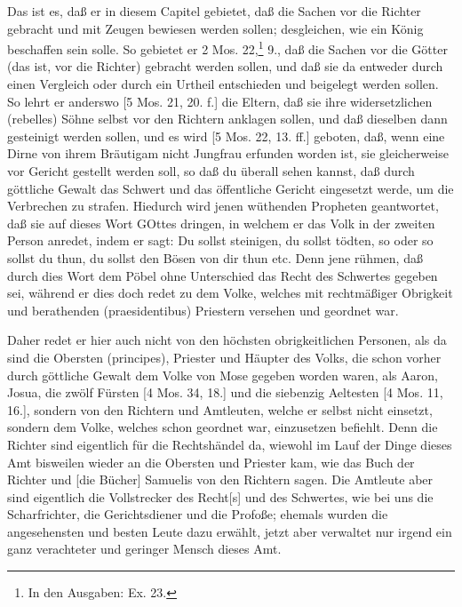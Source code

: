 Das ist es, daß er in diesem Capitel gebietet, daß die Sachen vor die Richter gebracht und mit Zeugen bewiesen werden sollen; desgleichen, wie ein König beschaffen sein solle. So gebietet er 2 Mos. 22,\footnote{In den Ausgaben: Ex. 23.} 9., daß die Sachen vor die Götter (das ist, vor die Richter) gebracht werden sollen, und daß sie da entweder durch einen Vergleich oder durch ein Urtheil entschieden und beigelegt werden sollen. So lehrt er anderswo [5 Mos. 21, 20. f.] die Eltern, daß sie ihre widersetzlichen (rebelles) Söhne selbst vor den Richtern anklagen sollen, und daß dieselben dann gesteinigt werden sollen, und es wird [5 Mos. 22, 13. ff.] geboten, daß, wenn eine Dirne von ihrem Bräutigam nicht Jungfrau erfunden worden ist, sie gleicherweise vor Gericht gestellt werden soll, so daß du überall sehen kannst, daß durch göttliche Gewalt das Schwert und das öffentliche Gericht eingesetzt werde, um die Verbrechen zu strafen. Hiedurch wird jenen wüthenden Propheten geantwortet, daß sie auf dieses Wort GOttes dringen, in welchem er das Volk in der zweiten Person anredet, indem er sagt: Du sollst steinigen, du sollst tödten, so oder so sollst du thun, du sollst den Bösen von dir thun etc. Denn jene rühmen, daß durch dies Wort dem Pöbel ohne Unterschied das Recht des Schwertes gegeben sei, während er dies doch redet zu dem Volke, welches mit rechtmäßiger Obrigkeit und berathenden (praesidentibus) Priestern versehen und geordnet war.

Daher redet er hier auch nicht von den höchsten obrigkeitlichen Personen, als da sind die Obersten (principes), Priester und Häupter des Volks, die schon vorher durch göttliche Gewalt dem Volke von Mose gegeben worden waren, als Aaron, Josua, die zwölf Fürsten [4 Mos. 34, 18.] und die siebenzig Aeltesten [4 Mos. 11, 16.], sondern von den Richtern und Amtleuten, welche er selbst nicht einsetzt, sondern dem Volke, welches schon geordnet war, einzusetzen befiehlt. Denn die Richter sind eigentlich für die Rechtshändel da, wiewohl im Lauf der Dinge dieses Amt bisweilen wieder an die Obersten und Priester kam, wie das Buch der Richter und [die Bücher] Samuelis von den Richtern sagen. Die Amtleute aber sind eigentlich die Vollstrecker des Recht[s] und des Schwertes, wie bei uns die Scharfrichter, die Gerichtsdiener und die Profoße; ehemals wurden die angesehensten und besten Leute dazu erwählt, jetzt aber verwaltet nur irgend ein ganz verachteter und geringer Mensch dieses Amt.

